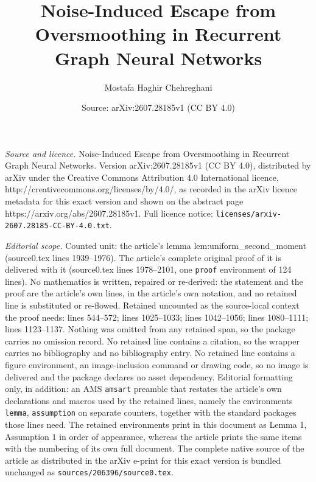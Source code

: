 \documentclass[10pt,a4paper]{amsart}
\title{Noise-Induced Escape from Oversmoothing in Recurrent Graph Neural Networks}
\author{Mostafa Haghir Chehreghani}
\date{Source: arXiv:2607.28185v1 (CC BY 4.0)}
\begin{document}
\maketitle

\noindent\emph{Source and licence.} Noise-Induced Escape from Oversmoothing in Recurrent Graph Neural Networks. Version arXiv:2607.28185v1 (CC BY 4.0), distributed by arXiv under the Creative Commons Attribution 4.0 International licence, http://creativecommons.org/licenses/by/4.0/, as recorded in the arXiv licence metadata for this exact version and shown on the abstract page https://arxiv.org/abs/2607.28185v1. Full licence notice: \texttt{licenses/arxiv-2607.28185-CC-BY-4.0.txt}.\par\smallskip

\noindent\textit{Editorial scope.} Counted unit: the article's lemma lem:uniform\_second\_moment (source0.tex lines 1939--1976). The article's complete original proof of it is delivered with it (source0.tex lines 1978--2101, one \texttt{proof} environment of 124 lines). No mathematics is written, repaired or re-derived: the statement and the proof are the article's own lines, in the article's own notation, and no retained line is substituted or re-flowed.  Retained uncounted as the source-local context the proof needs: lines 544--572; lines 1025--1033; lines 1042--1056; lines 1080--1111; lines 1123--1137.  Nothing was omitted from any retained span, so the package carries no omission record.  No retained line contains a citation, so the wrapper carries no bibliography and no bibliography entry.  No retained line contains a figure environment, an image-inclusion command or drawing code, so no image is delivered and the package declares no asset dependency.  Editorial formatting only, in addition: an AMS \texttt{amsart} preamble that restates the article's own declarations and macros used by the retained lines, namely the environments \texttt{lemma}, \texttt{assumption} on separate counters, together with the standard packages those lines need.  The retained environments print in this document as Lemma 1, Assumption 1 in order of appearance, whereas the article prints the same items with the numbering of its own full document.  The complete native source of the article as distributed in the arXiv e-print for this exact version is bundled unchanged as \texttt{sources/206396/source0.tex}.
\end{document}
